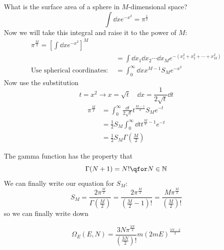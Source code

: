 \documentclass[a4paper,twoside,master.tex]{subfiles}
\begin{document}
What is the surface area of a sphere in $ M $-dimensional space?
\begin{equation}
    \int \dd{x} e^{-x^2} = \pi^{\frac{1}{2}}
\end{equation}
Now we will take this integral and raise it to the power of $ M $:
\begin{align}
    \pi^{\frac{M}{2}} = \left[ \int \dd{x} e^{-x^2} \right]^M \\
    &= \int \dd{x_1} \dd{x_2} \cdots \dd{x_M} e^{-(x_1^2 + x_2^2 + \cdots + x_M^2)} \\
    \text{Use spherical coordinates: } &= \int_0^{\infty} \dd{x} x^{M-1} S_M e^{-x^2}
\end{align}
Now use the substitution
\begin{equation}
    t = x^2 \to x = \sqrt{t} \quad \dd{x} = \frac{1}{2 \sqrt{t}} \dd{t}
\end{equation}
\begin{align}
    \pi^{\frac{M}{2}} &= \int_0^{\infty} \frac{\dd{t}}{2 \sqrt{t}} t^{\frac{M-1}{2}} S_M e^{-t} \\
    &= \frac{1}{2} S_M \int_0^{\infty} \dd{t} t^{\frac{M}{2} - 1} e^{-t} \\
    &= \frac{1}{2} S_M \Gamma\left( \frac{M}{2} \right)
\end{align}

The gamma function has the property that
\begin{equation}
    \Gamma(N+1) = N! \qfor N \in \mathbb{N}
\end{equation}
We can finally write our equation for $ S_M $:
\begin{equation}
    S_M = \frac{2 \pi^{\frac{M}{2}}}{\Gamma\left( \frac{M}{2} \right)} = \frac{2 \pi^{\frac{M}{2}}}{\left( \frac{M}{2} - 1 \right)!} = \frac{M \pi^{\frac{M}{2}}}{\left( \frac{M}{2} \right)!}
\end{equation}
so we can finally write down

\begin{equation}
    \Omega_E(E, N) = \frac{3N \pi^{\frac{3N}{2}}}{\left( \frac{3N}{2} \right)!} m(2mE)^{\frac{3N-2}{2}}
\end{equation}
\end{document}
